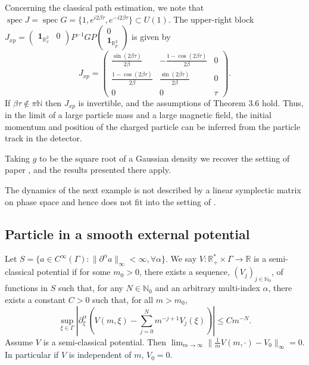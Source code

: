 \documentclass[12pt]{article}
\begin{document}
Concerning the classical path estimation, we note that $\operatorname{spec} J=\operatorname{spec} G=\{1,e^{i2\beta\tau},e^{-i2\beta\tau}\}\subset U(1)$. The upper-right block 
$J_{xp}=\begin{pmatrix}\mathbf{1}_{\mathbb R_x^3}& 0\end{pmatrix}P^{-1}GP\begin{pmatrix}0\\\mathbf{1}_{\mathbb R_p^3}\end{pmatrix}$ 
is given by
$$J_{xp}=\begin{pmatrix}
	\frac{\operatorname{sin}(2\beta \tau)}{2\beta} & -\frac{1-\cos(2\beta\tau)}{2\beta} & 0\\
	\frac{1-\cos(2\beta\tau)}{2\beta}& \frac{\operatorname{sin}(2\beta \tau)}{2\beta} &0\\
	0&0&\tau
\end{pmatrix}.$$
If $\beta\tau\notin \pi\mathbb N$ then $J_{xp}$ is invertible, and the assumptions of Theorem 3.6 hold. Thus, 
in the limit of a large particle mass and a large magnetic field, the initial momentum and position of the charged 
particle can be inferred from the particle track in the detector. 

Taking $g$ to be the square root of a Gaussian density we recover the setting of paper \cite{BBFF}, 
and the results presented there apply.

\medskip
The dynamics of the next example is not described by a linear symplectic matrix on phase space and hence does not fit 
into the setting of \cite{BBFF}.

\subsection{Particle in a smooth external potential}
Let $S=\{ a\in C^{\infty}(\Gamma): \|\partial^{\alpha}a\|_\infty<\infty, \forall \alpha\}$. We say 
$V:\mathbb R_+^*\times \Gamma\to \mathbb R$ is a semi-classical potential if for some $m_0>0$, 
there exists a sequence, $(V_j)_{j\in \mathbb N_0}$, of functions in $S$ such that, for any $N\in \mathbb N_0$ and 
an arbitrary multi-index $\alpha$, there exists a constant $C>0$ such that, for all $m>m_0$,
$$\sup_{\xi\in \Gamma}\left|\partial_\xi^\alpha\left(V(m,\xi)-\sum_{j=0}^Nm^{-j+1}V_j(\xi)\right)\right|\leq Cm^{-N}.$$
Assume $V$ is a semi-classical potential. Then $\lim_{m\to\infty}\|\frac1m V(m,\cdot)- V_0\|_\infty=0$. In particular 
if $V$ is independent of $m$, $V_0=0$.
\end{document}
